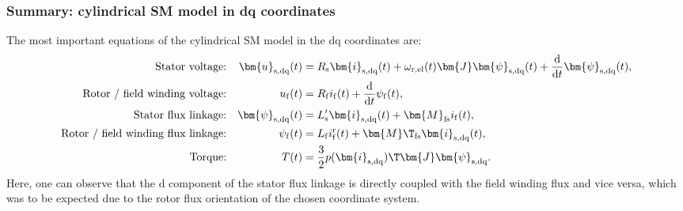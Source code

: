 \begin{frame}
	\frametitle{Summary: cylindrical SM model in dq coordinates}
	The most important equations of the cylindrical SM model in the  dq coordinates are:
	\begin{equation*}
		\begin{alignedat}{4}
			 &  & \mbox{Stator voltage:}                     &  & \quad\bm{u}_\mathrm{s,dq}(     & t) &  & = R_\mathrm{s} \bm{i}_\mathrm{s,dq}(t)+ \omega_\mathrm{r,el}(t)\bm{J}\bm{\psi}_\mathrm{s,dq}(t) + \frac{\mathrm{d}}{\mathrm{d}t}\bm{\psi}_\mathrm{s,dq}(t), \\
			 &  & \mbox{Rotor / field winding  voltage:}     &  & \quad u_\mathrm{f}(            & t) &  & = R_\mathrm{f}i_\mathrm{f}(t)+\frac{\mathrm{d}}{\mathrm{d}t}\psi_\mathrm{f}(t),                                                                             \\
			 &  & \mbox{Stator flux linkage:}                &  & \quad \bm{\psi}_\mathrm{s,dq}( & t) &  & = L'_\mathrm{s} \bm{i}_\mathrm{s,dq}(t) + \bm{M}_\mathrm{fs} i_{\mathrm{f}}(t),                                                                             \\
			 &  & \mbox{Rotor / field winding flux linkage:} &  & \psi_\mathrm{f}(               & t) &  & = L_\mathrm{f} i^\mathrm{r}_\mathrm{f}(t) + \bm{M}\T_\mathrm{fs} \bm{i}_\mathrm{s,dq}(t),                                                                   \\
			 &  & \mbox{Torque:}                             &  & \quad T(                       & t) &  & = \frac{3}{2} p (\bm{i}_\mathrm{s,dq})\T\bm{J}\bm{\psi}_\mathrm{s,dq}.
		\end{alignedat}
	\end{equation*}
	Here, one can observe that the d component of the stator flux linkage is directly coupled with the field winding flux and vice versa, which was to be expected due to the rotor flux orientation of the chosen coordinate system.
\end{frame}

